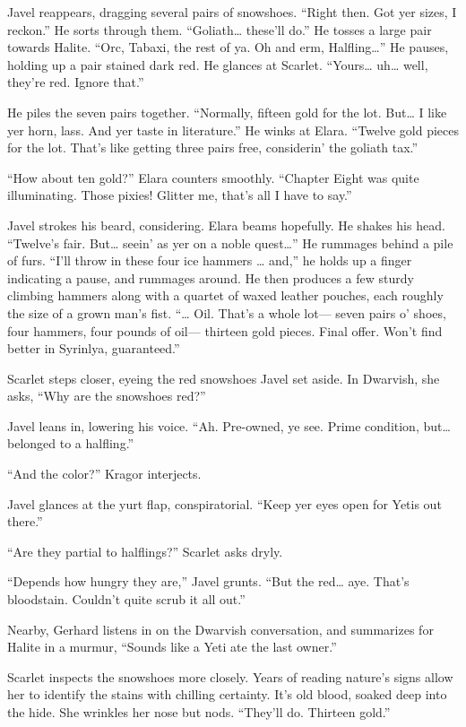 \documentclass[
  letterpaper,12pt,twoside,twocolumn,openany,
  nodeprecatedcode,bg=full]{dndbook}
\begin{document}
Javel reappears, dragging several pairs of snowshoes. ``Right then. Got
yer sizes, I reckon.'' He sorts through them. ``Goliath\ldots{} these'll
do.'' He tosses a large pair towards Halite. ``Orc, Tabaxi, the rest of
ya. Oh and erm, Halfling\ldots{}'' He pauses, holding up a pair stained
dark red. He glances at Scarlet. ``Yours\ldots{} uh\ldots{} well,
they're red. Ignore that.''

He piles the seven pairs together. ``Normally, fifteen gold for the lot.
But\ldots{} I like yer horn, lass. And yer taste in literature.'' He
winks at Elara. ``Twelve gold pieces for the lot. That's like getting
three pairs free, considerin' the goliath tax.''

``How about ten gold?'' Elara counters smoothly. ``Chapter Eight was
quite illuminating. Those pixies! Glitter me, that's all I have to
say.''

Javel strokes his beard, considering. Elara beams hopefully. He shakes
his head. ``Twelve's fair. But\ldots{} seein' as yer on a noble
quest\ldots{}'' He rummages behind a pile of furs. ``I'll throw in these
four ice hammers \ldots{} and,'' he holds up a finger indicating a
pause, and rummages around. He then produces a few sturdy climbing
hammers along with a quartet of waxed leather pouches, each roughly the
size of a grown man's fist. ``\ldots{} Oil. That's a whole lot--- seven
pairs o' shoes, four hammers, four pounds of oil--- thirteen gold
pieces. Final offer. Won't find better in Syrinlya, guaranteed.''

Scarlet steps closer, eyeing the red snowshoes Javel set aside. In
Dwarvish, she asks, ``Why are the snowshoes red?''

Javel leans in, lowering his voice. ``Ah. Pre-owned, ye see. Prime
condition, but\ldots{} belonged to a halfling.''

``And the color?'' Kragor interjects.

Javel glances at the yurt flap, conspiratorial. ``Keep yer eyes open for
Yetis out there.''

``Are they partial to halflings?'' Scarlet asks dryly.

``Depends how hungry they are,'' Javel grunts. ``But the red\ldots{}
aye. That's bloodstain. Couldn't quite scrub it all out.''

Nearby, Gerhard listens in on the Dwarvish conversation, and summarizes
for Halite in a murmur, ``Sounds like a Yeti ate the last owner.''

Scarlet inspects the snowshoes more closely. Years of reading nature's
signs allow her to identify the stains with chilling certainty. It's old
blood, soaked deep into the hide. She wrinkles her nose but nods.
``They'll do. Thirteen gold.''
\end{document}
